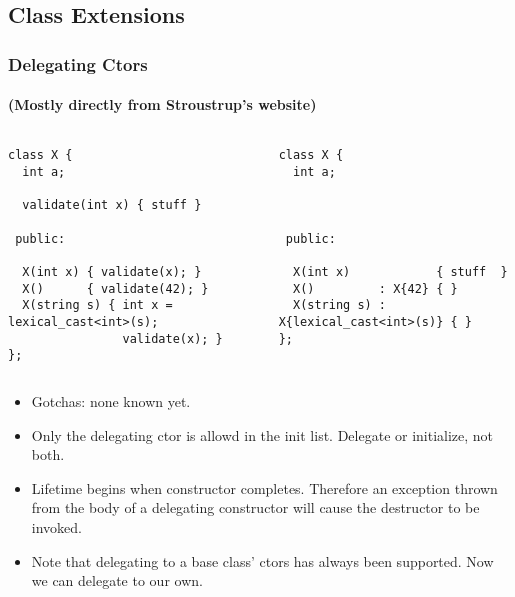 
\subsection{Class Extensions}
\lyxframeend{}


\begin{frame}[fragile]
\frametitle{Delegating Ctors}
\framesubtitle{(Mostly directly from Stroustrup's website)}
\begin{columns}[t]
{\scriptsize

\begin{verbatim}  
class X {
  int a;

  validate(int x) { stuff }

 public:

  X(int x) { validate(x); }
  X()      { validate(42); }
  X(string s) { int x = lexical_cast<int>(s); 
                validate(x); }
};
\end{verbatim}
}
\pause{}
{\scriptsize
\begin{verbatim} 
class X {
  int a;



 public:

  X(int x)            { stuff  }
  X()         : X{42} { }
  X(string s) : X{lexical_cast<int>(s)} { }
};
\end{verbatim}
}
\end{columns}
\pause{}
\begin{itemize}
\item Gotchas: none known yet.
\item Only the delegating ctor is allowd in the init list.  Delegate
  or initialize, not both.
\item Lifetime begins when  constructor completes.
  Therefore an exception thrown from the body of a
  delegating constructor will cause the destructor to be invoked.

\item Note that delegating to a base class' ctors has always been
supported.  Now we can delegate to our own.

\end{itemize}
\end{frame}


